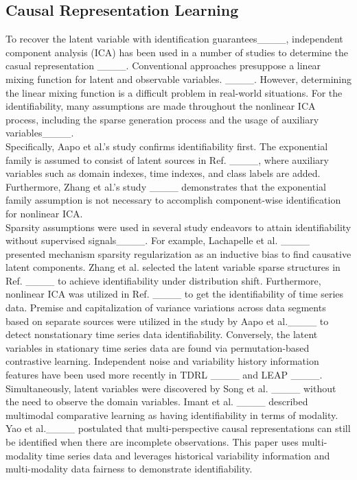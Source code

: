 \subsection{Causal Representation Learning}
To recover the latent variable with identification guarantees____, independent component analysis (ICA) has been used in a number of studies to determine the casual representation ____. 
Conventional approaches presuppose a linear mixing function for latent and observable variables. ____. However, determining the linear mixing function is a difficult problem in real-world situations. For the identifiability, many assumptions are made throughout the nonlinear ICA process, including the sparse generation process and the usage of auxiliary variables____.\\
Specifically, Aapo et al.'s study confirms identifiability first. The exponential family is assumed to consist of latent sources in Ref. ____, where auxiliary variables such as domain indexes, time indexes, and class labels are added. Furthermore, Zhang et al.'s study ____ demonstrates that the exponential family assumption is not necessary to accomplish component-wise identification for nonlinear ICA. \\
Sparsity assumptions were used in several study endeavors to attain identifiability without supervised signals____. For example, Lachapelle et al. ____ presented mechanism sparsity regularization as an inductive bias to find causative latent components. Zhang et al. selected the latent variable sparse structures in Ref. ____ to achieve identifiability under distribution shift. Furthermore, nonlinear ICA was utilized in Ref. ____ to get the identifiability of time series data. 
Premise and capitalization of variance variations across data segments based on separate sources were utilized in the study by Aapo et al.____ to detect nonstationary time series data identifiability. Conversely, the latent variables in stationary time series data are found via permutation-based contrastive learning. Independent noise and variability history information features have been used more recently in TDRL ____ and LEAP ____. \\
Simultaneously, latent variables were discovered by Song et al. ____ without the need to observe the domain variables. Imant et al. ____ described multimodal comparative learning as having identifiability in terms of modality. Yao et al.____ postulated that multi-perspective causal representations can still be identified when there are incomplete observations. This paper uses multi-modality time series data and leverages historical variability information and multi-modality data fairness to demonstrate identifiability.


\clearpage
\appendix